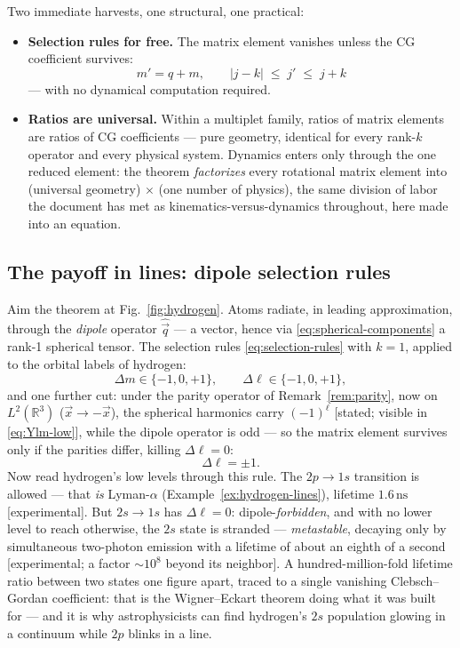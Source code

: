 \documentclass[11pt]{article}
\theoremstyle{plain}
\theoremstyle{definition}
\theoremstyle{remark}
\newcommand{\R}{\mathbb{R}}
\newcommand{\vx}{\vec{x}}
\newcommand{\op}[1]{\hat{#1}}
\begin{document}
Two immediate harvests, one structural, one practical:
\begin{itemize}
  \item \textbf{Selection rules for free.} The matrix element
  vanishes unless the CG coefficient survives:
  \begin{equation}
    m' = q + m,
    \qquad
    |j - k| \;\le\; j' \;\le\; j + k
    \label{eq:selection-rules}
  \end{equation}
  --- with no dynamical computation required.
  \item \textbf{Ratios are universal.} Within a multiplet family,
  ratios of matrix elements are ratios of CG coefficients ---
  pure geometry, identical for every rank-$k$ operator and every
  physical system. Dynamics enters only through the one reduced
  element: the theorem \emph{factorizes} every rotational matrix
  element into (universal geometry) $\times$ (one number of
  physics), the same division of labor the document has met as
  kinematics-versus-dynamics throughout, here made into an
  equation.
\end{itemize}

\subsection{The payoff in lines: dipole selection rules}
\label{sec:dipole-selection}

Aim the theorem at Fig.~\ref{fig:hydrogen}. Atoms radiate, in
leading approximation, through the \emph{dipole} operator
$\op{\vec q}$ --- a vector, hence via
\eqref{eq:spherical-components} a rank-1 spherical tensor. The
selection rules \eqref{eq:selection-rules} with $k = 1$, applied to
the orbital labels of hydrogen:
\begin{equation}
  \Delta m \in \{-1, 0, +1\},
  \qquad
  \Delta\ell \in \{-1, 0, +1\},
\end{equation}
and one further cut: under the parity operator of
Remark~\ref{rem:parity}, now on $L^2(\R^3)$
($\vx \to -\vx$), the spherical harmonics carry $(-1)^\ell$ [stated;
visible in \eqref{eq:Ylm-low}], while the dipole operator is odd
--- so the matrix element survives only if the parities differ,
killing $\Delta\ell = 0$:
\begin{equation}
  \boxed{\;
  \Delta\ell = \pm1 .
  \;}
\end{equation}
Now read hydrogen's low levels through this rule. The
$2p \to 1s$ transition is allowed --- that \emph{is} Lyman-$\alpha$
(Example~\ref{ex:hydrogen-lines}), lifetime
$1.6\,\mathrm{ns}$ [experimental]. But $2s \to 1s$ has
$\Delta\ell = 0$: dipole-\emph{forbidden}, and with no lower level
to reach otherwise, the $2s$ state is stranded --- \emph{metastable},
decaying only by simultaneous two-photon emission with a lifetime
of about an eighth of a second [experimental; a factor
$\sim10^{8}$ beyond its neighbor]. A hundred-million-fold lifetime
ratio between two states one figure apart, traced to a single
vanishing Clebsch--Gordan coefficient: that is the Wigner--Eckart
theorem doing what it was built for --- and it is why astrophysicists can
find hydrogen's $2s$ population glowing in a continuum while $2p$
blinks in a line.
\end{document}
